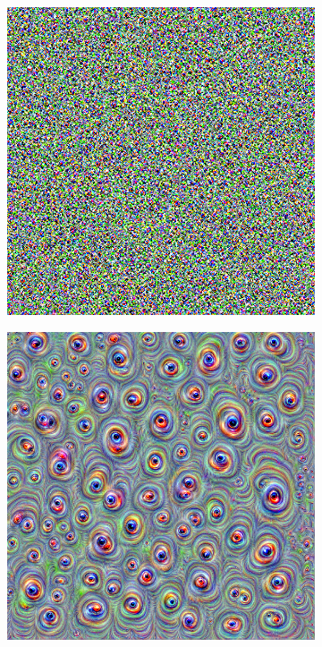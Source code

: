 \begin{figure}
    \captionsetup{justification=centering}

    \begin{subfigure}[t]{0.31\textwidth}
        \captionsetup{justification=centering}
        \centering
        \includegraphics[width=.7\linewidth]{figuras/feat_vis/experiments/intermediary/l8/random_image_pl1_lr4e-1_layer17_no-blur.png}
        \caption{}
    \end{subfigure}
    \hfill
    \begin{subfigure}[t]{0.31\textwidth}
        \captionsetup{justification=centering}
        \centering
        \includegraphics[width=.7\linewidth]{figuras/feat_vis/experiments/intermediary/l8/random_image_pl4_lr4e-2_layer17_no-blur.png}
        \caption{}
    \end{subfigure}

\end{figure}
